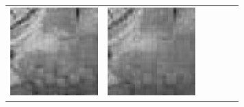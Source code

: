 \documentclass[11pt,a4paper,openright,oneside]{book}
\numberwithin{equation}{section}
\begin{document}
{\begin{figure}[h]
\begin{adjustwidth}{-3cm}{-3cm}
\begin{tabular}{>{\centering\arraybackslash}m{1.5cm} m{2.5cm} m{2.5cm} m{2.5cm} m{2.5cm} m{2.5cm}}
        \includegraphics[width=\linewidth]{media/tnale/AAAfruits-comp3-ale-2.png} & 
        \includegraphics[width=\linewidth]{media/tnale/AAAfruits-comp4-ale-2.png} &

\end{tabular}
\end{adjustwidth}
\end{figure}}
\end{document}
